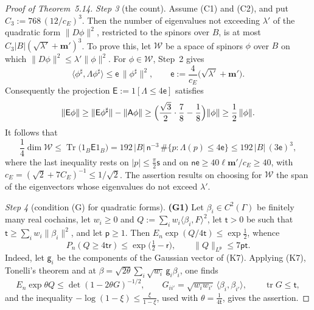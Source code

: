 \documentclass[11pt]{amsart}
\theoremstyle{definition}
\begin{document}
\begin{proof}[Proof of Theorem~5.14]
\emph{Step 3} (the count).
Assume (C1) and (C2), and put $C_3:=768\,(12/c_E)^3$.
Then the number of eigenvalues not exceeding $\lambda'$ of the quadratic form $\|D\phi\|^2$, restricted to the spinors over $B$, is at most $C_3|B|(\sqrt{\lambda'}+\mathbf m')^3$.
To prove this, let $\mathcal W$ be a space of spinors $\phi$ over $B$ on which $\|D\phi\|^2\le\lambda'\|\phi\|^2$.
For $\phi\in\mathcal W$, Step~2 gives
\begin{equation*}
\langle\phi^\sharp,\Lambda\phi^\sharp\rangle\le\mathsf e\,\|\phi^\sharp\|^2,\qquad\mathsf e:=\frac{4}{c_E}\bigl(\sqrt{\lambda'}+\mathbf m'\bigr).
\end{equation*}
Consequently the projection $\mathsf E:=1[\Lambda\le4\mathsf e]$ satisfies
\begin{equation*}
\|\mathsf E\phi\|\ge\|\mathsf E\phi^\sharp\|-\|\mathsf A\phi\|\ge\Bigl(\frac{\sqrt3}{2}\cdot\frac78-\frac18\Bigr)\|\phi\|\ge\frac12\,\|\phi\|.
\end{equation*}
It follows that
\begin{equation*}
\frac14\dim\mathcal W\le\operatorname{Tr}\bigl(1_B\mathsf E1_B\bigr)=192\,|B|\,\mathsf n^{-3}\,\#\{p:\Lambda(p)\le4\mathsf e\}\le192\,|B|\,(3\mathsf e)^3,
\end{equation*}
where the last inequality rests on $|p|\le\frac\pi2\mathsf s$ and on $\mathsf n\mathsf e\ge40\ell\mathbf m'/c_E\ge40$, with $c_E=(\sqrt2+7C_E)^{-1}\le1/\sqrt2$.
The assertion results on choosing for $\mathcal W$ the span of the eigenvectors whose eigenvalues do not exceed $\lambda'$.

\emph{Step 4} (condition (G) for quadratic forms).
\textbf{(G1)} Let $\beta_i\in C^2(\Gamma)$ be finitely many real cochains, let $w_i\ge0$ and $Q:=\sum_iw_i\langle\beta_i,F\rangle^2$, let $\mathsf t>0$ be such that $\mathsf t\ge\sum_iw_i\|\beta_i\|^2$, and let $\mathsf p\ge1$.
Then $E_n\exp(Q/4\mathsf t)\le\exp\frac12$, whence
\begin{equation*}
P_n(Q\ge4\mathsf t\mathsf r)\le\exp\bigl(\tfrac12-\mathsf r\bigr),\qquad\|Q\|_{L^{\mathsf p}}\le7\mathsf p\mathsf t.
\end{equation*}
Indeed, let $\mathsf g_i$ be the components of the Gaussian vector of (K7).
Applying (K7), Tonelli's theorem and \cite[Theorem~6.27\,(a)]{QEDII} at $\beta=\sqrt{2\theta}\sum_i\sqrt{w_i}\,\mathsf g_i\beta_i$, one finds
\begin{equation*}
E_n\exp\theta Q\le\det(1-2\theta G)^{-1/2},\qquad G_{ii'}=\sqrt{w_iw_{i'}}\,\langle\beta_i,\beta_{i'}\rangle,\qquad\operatorname{tr}G\le\mathsf t,
\end{equation*}
and the inequality $-\log(1-\xi)\le\frac{\xi}{1-\xi}$, used with $\theta=\frac1{4\mathsf t}$, gives the assertion.


\end{proof}
\end{document}
